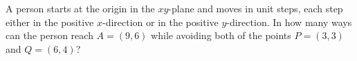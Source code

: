 A person starts at the origin in the $xy$-plane and moves in unit steps, each step either in the positive $x$-direction or in the positive $y$-direction. In how many ways can the person reach $A=(9,6)$ while avoiding both of the points $P=(3,3)$ and $Q=(6,4)$?
